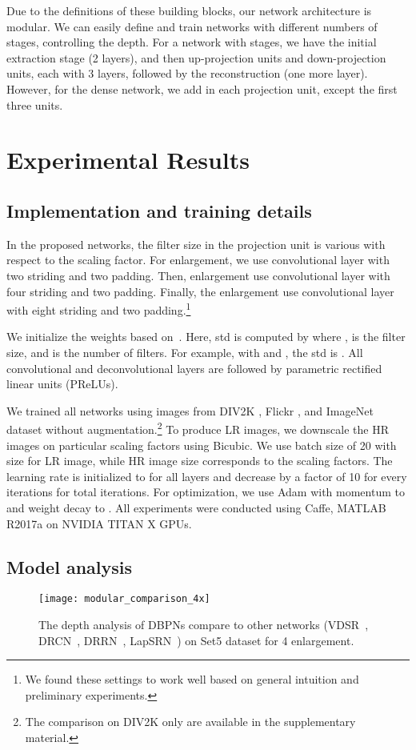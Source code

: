 \documentclass[10pt,twocolumn,letterpaper]{article}
\begin{document}
Due to the definitions of these building blocks, our network
architecture is modular. We can easily define and train networks with
different numbers of stages, controlling the depth. For a network with
 stages, we have the initial extraction stage (2 layers), and then
 up-projection units and  down-projection units, each with 3
layers, followed by the reconstruction (one more layer). However, for the dense network, we add  in each projection unit, except the first three units.


\section{Experimental Results}
\subsection{Implementation and training details}
In the proposed networks, the filter size in the projection unit is
various with respect to the scaling factor. For  enlargement,
we use  convolutional layer with two striding and two
padding. Then,  enlargement use  convolutional
layer with four striding and two padding. Finally, the 
enlargement use  convolutional layer with eight striding
and two padding.\footnote{We found these settings to work well based
  on general intuition and preliminary experiments.}

We initialize the weights based on~\cite{he2015delving}. Here, std is computed by  where ,  is the filter size, and  is the number of filters. For example, with  and , the std is . All convolutional and deconvolutional layers are followed by parametric rectified linear units (PReLUs).

We trained all networks using images from DIV2K \cite{timofte2017ntire}, Flickr \cite{Lim_2017_CVPR_Workshops}, and ImageNet dataset \cite{russakovsky2015imagenet} without augmentation.\footnote{The comparison on DIV2K only are available in the supplementary material.} To produce LR images, we downscale the HR images on particular scaling factors using Bicubic. We use batch size of 20 with size  for LR image, while HR image size corresponds to the scaling factors. The learning rate is initialized to  for all layers and decrease by a factor of 10 for every  iterations for total  iterations. For optimization, we use Adam with momentum to  and weight decay to . All experiments were conducted using Caffe, MATLAB R2017a on NVIDIA TITAN X GPUs.

\subsection{Model analysis}
\label{subsec:modelanalysis}
\begin{figure}[t]
\centering
\texttt{[image: modular\_comparison\_4x]}
\caption{The depth analysis of DBPNs compare to other networks (VDSR~\cite{Kim_2016_VDSR}, DRCN~\cite{kim2016deeply}, DRRN~\cite{Tai-DRRN-2017}, LapSRN~\cite{LapSRN}) on Set5 dataset for 4 enlargement.}
\label{figure:modular_comparison_4x}
\end{figure} 
\end{document}
